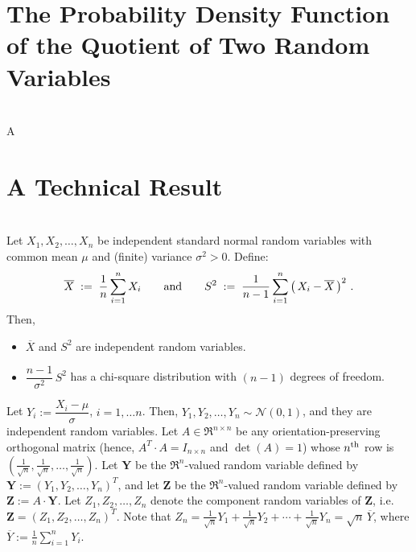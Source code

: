 \documentclass{article}
\begin{document}

\appendix


\section{The Probability Density Function of the Quotient of Two Random Variables}
\setcounter{theorem}{0}

\begin{theorem}\label{pdf:quotient}\mbox{}\\
A
\end{theorem}


\section{A Technical Result}
\setcounter{theorem}{0}

\begin{theorem}\label{SampleMean:SampleVariance:Independence}\mbox{}\\
Let $X_{1}, X_{2}, \ldots, X_{n}$ be independent standard normal random variables with common mean $\mu$ and (finite) variance $\sigma^{2} > 0 $.  Define:
\begin{equation*}
\overline{X} \; := \; \dfrac{1}{n}\sum_{i=1}^{n}X_{i}
\quad\quad\textnormal{and}\quad\quad
S^{2} \; := \; \dfrac{1}{n-1}\sum_{i=1}^{n}\left(\,X_{i}-\overline{X}\,\right)^{2}\,.
\end{equation*}
Then,
\begin{itemize}
\item  $\overline{X}$ and $S^{2}$ are independent random variables.
\item  $\dfrac{n-1}{\sigma^{2}}\,S^{2}$ has a chi-square distribution with $(n-1)$ degrees of freedom.
\end{itemize}
\end{theorem}

\proof  Let $Y_{i} := \dfrac{X_{i}-\mu}{\sigma}$, $i = 1, \ldots n$.  Then, $Y_{1}, Y_{2}, \ldots, Y_{n} \sim \mathcal{N}(0,1)$, and they are independent random variables.   Let $A \in \Re^{n \times n}$ be any orientation-preserving orthogonal matrix (hence, $A^{T}\cdot A = I_{n \times n}$ and $\det(A) = 1$) whose $n^{\textnormal{th}}$ row is $\left(\frac{1}{\sqrt{n}},\frac{1}{\sqrt{n}},\ldots,\frac{1}{\sqrt{n}}\right)$.  Let $\mathbf{Y}$ be the $\Re^{n}$-valued random variable defined by $\mathbf{Y} := (Y_{1},Y_{2},\ldots,Y_{n})^{T}$, and let $\mathbf{Z}$ be the $\Re^{n}$-valued random variable defined by $\mathbf{Z} := A\cdot\mathbf{Y}$.  Let $Z_{1}, Z_{2}, \ldots, Z_{n}$ denote the component random variables of $\mathbf{Z}$, i.e. $\mathbf{Z} = \left(Z_{1},Z_{2},\ldots,Z_{n}\right)^{T}$.  Note that $Z_{n} = \frac{1}{\sqrt{n}}Y_{1} + \frac{1}{\sqrt{n}}Y_{2} + \cdots + \frac{1}{\sqrt{n}}Y_{n} = \sqrt{n}\,\overline{Y}$, where $\overline{Y} := \frac{1}{n}\sum_{i=1}^{n}Y_{i}$.
\end{document}
